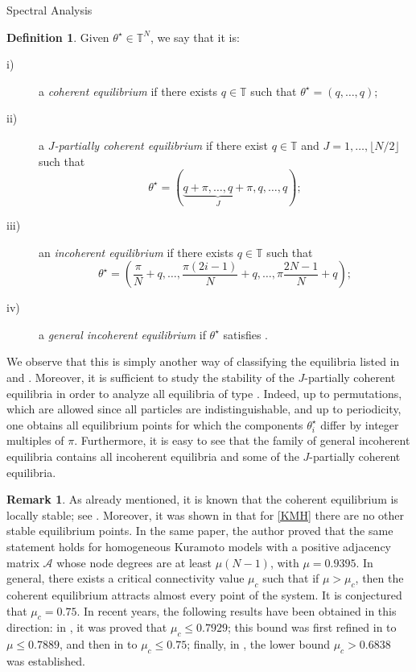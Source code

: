 \documentclass{article}
\theoremstyle{definition}
\newtheorem{definition}{Definition}[section]
\newtheorem{rk}{Remark}[section]
\newcommand{\T}{\mathbb{T}}
\begin{document}
\begin{section}{Spectral Analysis}
\begin{definition}
Given $\theta^\star\in\T^N$, we say that it is:
    \begin{description}
        \item[i)\label{i}] a \textit{coherent equilibrium} if there exists $q\in\T$ such that $\theta^\star=(q,\ldots,q)$;
        \item[ii)\label{ii}] a \textit{$J$-partially coherent equilibrium} if there exist $q\in\T$ and $J=1,\ldots,\lfloor N/2\rfloor$ such that
        $$\theta^\star=\left(\underbrace{q+\pi,\ldots,q+\pi}_{J},q,\ldots,q\right);$$
        \item[iii)\label{iii}] an \textit{incoherent equilibrium} if there exists $q\in\T$ such that
        $$\theta^\star=\left(\frac{\pi}{N}+q,\ldots,\frac{\pi(2i-1)}{N}+q,\ldots,\pi\frac{2N-1}{N}+q\right);$$
        \item[iv)\label{iv}] a \textit{general incoherent equilibrium} if $\theta^\star$ satisfies .
    \end{description}
\end{definition}

We observe that this is simply another way of classifying the equilibria listed in  and . Moreover, it is sufficient to study the stability of the $J$-partially coherent equilibria in order to analyze all equilibria of type . Indeed, up to permutations, which are allowed since all particles are indistinguishable, and up to periodicity, one obtains all equilibrium points for which the components $\theta^\star_i$ differ by integer multiples of $\pi$. Furthermore, it is easy to see that the family of general incoherent equilibria contains all incoherent equilibria and some of the $J$-partially coherent equilibria.

\begin{rk}
    As already mentioned, it is known that the coherent equilibrium is locally stable; see \cite{arenas2008synchronization}. Moreover, it was shown in \cite{taylor2012there} that for \eqref{KMH} there are no other stable equilibrium points. In the same paper, the author proved that the same statement holds for homogeneous Kuramoto models with a positive adjacency matrix $\mathcal{A}$ whose node degrees are at least $\mu(N-1)$, with $\mu=0.9395$. In general, there exists a critical connectivity value $\mu_c$ such that if $\mu>\mu_c$, then the coherent equilibrium attracts almost every point of the system. It is conjectured that $\mu_c=0.75$. In recent years, the following results have been obtained in this direction: in \cite{ling2019landscape}, it was proved that $\mu_c\leq0.7929$; this bound was first refined in \cite{lu2020synchronization} to $\mu\leq0.7889$, and then in \cite{kassabov2021sufficiently} to $\mu_c\leq0.75$; finally, in \cite{yoneda2021lower}, the lower bound $\mu_c>0.6838$ was established.
\end{rk}


\end{section}
\end{document}
